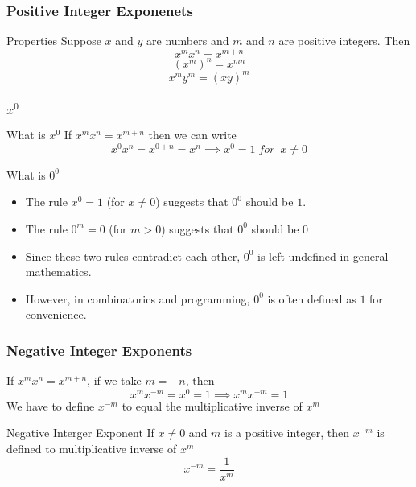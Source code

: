 \begin{frame}
  \frametitle{Positive Integer Exponenets}
  \begin{block}{Properties}
    Suppose \(x\) and \(y\) are numbers and \(m\) and \(n\) are positive integers. Then 
    \[x^{m}x^{n} = x^{m+n} \]   
    \[\left(x^{m}\right)^{n} = x^{mn} \] 
    \[x^{m}y^{m} = \left(xy\right)^{m} \] 
  \end{block}
\end{frame}
\begin{frame}
  \frametitle{\(x^{0}\)} 
  \begin{alertblock}{What is \(x^{0}\)}
    If  \(x^{m}x^{n} = x^{m+n}\) then we can write \[x^{0}x^{n} = x^{0+n} = x^{n} \implies x^{0} = 1\;for\;\ x \neq 0\]
   \end{alertblock}

   \begin{alertblock}{What is \(0^{0}\)}
    \begin{itemize}
      \item The rule \( x^0 = 1 \) (for \( x \neq 0 \)) suggests that \( 0^0 \) should be \(1\).
      \item The rule \( 0^m = 0 \) (for \( m > 0 \)) suggests that \( 0^0 \) should be \(0\)
      \item Since these two rules contradict each other, \( 0^0 \) is left undefined in general mathematics.
      \item However, in combinatorics and programming, \( 0^0 \) is often defined as \(1\) for convenience.
  \end{itemize}
   \end{alertblock}
\end{frame}

\begin{frame}
  \frametitle{Negative Integer Exponents}
  If \(x^{m}x^{n} = x^{m+n}\), if we take \(m = -n \), then 
  \[x^{m}x^{-m} = x^{0} = 1 \implies x^{m}x^{-m} = 1\]
  We have to define \(x^{-m}\) to equal the multiplicative inverse of \(x^{m}\)
\begin{block}{Negative Interger Exponent}
  If \(x \neq 0\) and \(m\) is a positive integer, then \(x^{-m}\) is defined to multiplicative inverse of \(x^{m}\) 
  \[x^{-m} = \frac{1}{x^{m}}\]
  
\end{block}
\end{frame}

